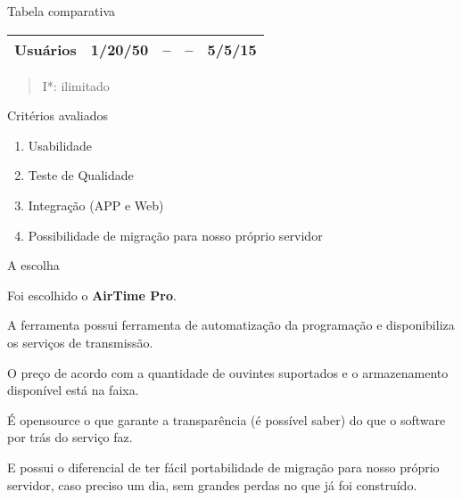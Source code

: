 \begin{frame}{Tabela comparativa}
\begin{longtable}[]{@{}ccccc@{}}
\begin{minipage}[t]{0.20\columnwidth}\centering\strut
Usuários\strut
\end{minipage} & \begin{minipage}[t]{0.18\columnwidth}\centering\strut
1/20/50\strut
\end{minipage} & \begin{minipage}[t]{0.14\columnwidth}\centering\strut
--\strut
\end{minipage} & \begin{minipage}[t]{0.17\columnwidth}\centering\strut
--\strut
\end{minipage} & \begin{minipage}[t]{0.17\columnwidth}\centering\strut
5/5/15\strut
\end{minipage}\tabularnewline
\bottomrule
\end{longtable}

\begin{quote}
I*: ilimitado
\end{quote}

\end{frame}

\begin{frame}{Critérios avaliados}

\begin{enumerate}
\def\labelenumi{\arabic{enumi}.}
\tightlist
\item
  Usabilidade
\item
  Teste de Qualidade
\item
  Integração (APP e Web)
\item
  Possibilidade de migração para nosso próprio servidor
\end{enumerate}

\end{frame}

\begin{frame}{A escolha}

Foi escolhido o \textbf{AirTime Pro}.

A ferramenta possui ferramenta de automatização da programação e
disponibiliza os serviços de transmissão.

O preço de acordo com a quantidade de ouvintes suportados e o
armazenamento disponível está na faixa.

É opensource o que garante a transparência (é possível saber) do que o
software por trás do serviço faz.

E possui o diferencial de ter fácil portabilidade de migração para nosso
próprio servidor, caso preciso um dia, sem grandes perdas no que já foi
construído.

\end{frame}
